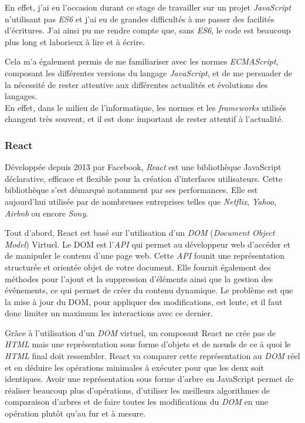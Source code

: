 \bigskip

En effet, j'ai eu l'occasion durant ce stage de travailler sur un projet
\emph{JavaScript} n'utilisant pas \emph{ES6} et j'ai eu de grandes
difficultés à me passer des facilités d'écritures. J'ai ainsi pu me
rendre compte que, sans \emph{ES6}, le code est beaucoup plus long et
laborieux à lire et à écrire.

\bigskip

Cela m'a également permis de me familiariser avec les normes
\emph{ECMAScript}, composant les différentes versions du langage
\emph{JavaScript}, et de me persuader de la nécessité de rester
attentive aux différentes actualités et évolutions des langages.\\
En effet, dans le milieu de l'informatique, les normes et les
\emph{frameworks} utilisés changent très souvent, et il est donc
important de rester attentif à l'actualité.

\bigskip

\subsubsection{React}\label{react}

\bigskip

Développée depuis 2013 par Facebook, \emph{React} est une bibliothèque
JavaScript déclarative, efficace et flexible pour la création
d'interfaces utilisateurs. Cette bibliothèque s'est démarqué notamment
par ses performances. Elle est aujourd'hui utilisée par de nombreuses
entreprises telles que \emph{Netflix}, \emph{Yahoo}, \emph{Airbnb} ou
encore \emph{Sony}.

\bigskip

Tout d'abord, React est basé sur l'utilisation d'un \emph{DOM}
(\emph{Document Object Model}) Virtuel. Le DOM est l'\emph{API} qui
permet au développeur web d'accéder et de manipuler le contenu d'une
page web. Cette \emph{API} founit une représentation structurée et
orientée objet de votre document. Elle fournit également des méthodes
pour l'ajout et la suppression d'éléments ainsi que la gestion des
événements, ce qui permet de créer du contenu dynamique. Le problème est
que la mise à jour du DOM, pour appliquer des modifications, est lente,
et il faut donc limiter un maximum les interactions avec ce dernier.

\bigskip

Grâce à l'utilisation d'un \emph{DOM} virtuel, un composant React ne
crée pas de \emph{HTML} mais une représentation sous forme d'objets et
de nœuds de ce à quoi le \emph{HTML} final doit ressembler. React va
comparer cette représentation au \emph{DOM} réel et en déduire les
opérations minimales à exécuter pour que les deux soit identiques. Avoir
une représentation sous forme d'arbre en JavaScript permet de réaliser
beaucoup plus d'opérations, d'utiliser les meilleurs algorithmes de
comparaison d'arbres et de faire toutes les modifications du \emph{DOM}
en une opération plutôt qu'au fur et à mesure.

